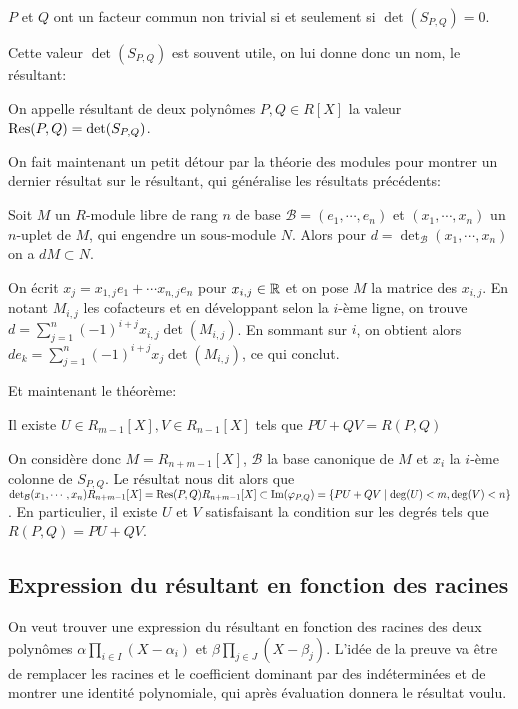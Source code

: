 \documentclass{article}
\begin{document}
\begin{theoreme}
$P$ et $Q$ ont un facteur commun non trivial si et seulement si $\det(S_{P, Q}) = 0$.
\end{theoreme}

Cette valeur $\det(S_{P, Q})$ est souvent utile, on lui donne donc un nom, le résultant:

\begin{definition}
On appelle résultant de deux polynômes $P, Q \in R[X]$ la valeur $\textrm{Res}(P, Q) = \det(S_{P, Q})$.
\end{definition}

On fait maintenant un petit détour par la théorie des modules pour montrer un dernier résultat sur le résultant, qui généralise les résultats précédents:

\begin{proposition}
Soit $M$ un $R$-module libre de rang $n$ de base $\mathcal{B} = (e_1, \cdots, e_n)$ et $(x_1, \cdots, x_n)$ un $n$-uplet de $M$, qui engendre un sous-module $N$. Alors pour $d =\det_\mathcal{B}(x_1, \cdots, x_n)$ on a $dM \subset N$.
\end{proposition}

\begin{preuve}
On écrit $x_j = x_{1, j}e_1 + \cdots x_{n, j}e_n$ pour $x_{i, j} \in \mathbb{R}$ et on pose $M$ la matrice des $x_{i, j}$. En notant $M_{i, j}$ les cofacteurs et en développant selon la $i$-ème ligne, on trouve $d = \sum_{j=1}^{n}{(-1)^{i+j}x_{i,j}\det(M_{i, j})}$. En sommant sur $i$, on obtient alors $de_k = \sum_{j=1}^{n}{(-1)^{i+j}x_j\det(M_{i, j})}$, ce qui conclut.\\
\end{preuve}
Et maintenant le théorème:
\begin{theoreme}
Il existe $U \in R_{m-1}[X], V \in R_{n-1}[X]$ tels que $PU + QV = R(P, Q)$
\end{theoreme}

\begin{preuve}
On considère donc $M = R_{n+m-1}[X]$, $\mathcal{B}$ la base canonique de $M$ et $x_i$ la $i$-ème colonne de $S_{P, Q}$. Le résultat nous dit alors que $\det_{\mathcal{B}}(x_1, \cdots, x_n)R_{n+m-1}[X] = \textrm{Res}(P, Q)R_{n+m-1}[X] \subset \textrm{Im}(\varphi_{P, Q}) = \{PU + QV \mid \deg(U) < m, \deg(V) < n\}$. En particulier, il existe $U$ et $V$ satisfaisant la condition sur les degrés tels que $R(P, Q) = PU + QV$.
\end{preuve}

\subsection{Expression du résultant en fonction des racines}
On veut trouver une expression du résultant en fonction des racines des deux polynômes $\alpha \prod_{i \in I}{(X-\alpha_i)}$ et $\beta\prod_{j \in J}{(X-\beta_j)}$. L'idée de la preuve va être de remplacer les racines et le coefficient dominant par des indéterminées et de montrer une identité polynomiale, qui après évaluation donnera le résultat voulu.\\
\end{document}
